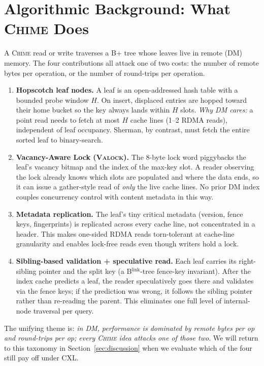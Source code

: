 \documentclass[11pt]{article}
\begin{document}
\section{Algorithmic Background: What \textsc{Chime} Does}
\label{sec:alg}
A \textsc{Chime} read or write traverses a B+ tree whose leaves live in remote (DM) memory. The four contributions all attack one of two costs: the number of remote bytes per operation, or the number of round-trips per operation.
\begin{enumerate}
    \item \textbf{Hopscotch leaf nodes.} A leaf is an open-addressed hash table with a bounded probe window $H$. On insert, displaced entries are hopped toward their home bucket so the key always lands within $H$ slots. \emph{Why DM cares:} a point read needs to fetch at most $H$ cache lines (1--2 RDMA reads), independent of leaf occupancy. Sherman, by contrast, must fetch the entire sorted leaf to binary-search.
    \item \textbf{Vacancy-Aware Lock (\textsc{Valock}).} The 8-byte lock word piggybacks the leaf's vacancy bitmap and the index of the max-key slot. A reader observing the lock already knows which slots are populated and where the data ends, so it can issue a gather-style read of \emph{only} the live cache lines. No prior DM index couples concurrency control with content metadata in this way.
    \item \textbf{Metadata replication.} The leaf's tiny critical metadata (version, fence keys, fingerprints) is replicated across every cache line, not concentrated in a header. This makes one-sided RDMA reads torn-tolerant at cache-line granularity and enables lock-free reads even though writers hold a lock.
    \item \textbf{Sibling-based validation + speculative read.} Each leaf carries its right-sibling pointer and the split key (a B$^{\text{link}}$-tree fence-key invariant). After the index cache predicts a leaf, the reader speculatively goes there and validates via the fence keys; if the prediction was wrong, it follows the sibling pointer rather than re-reading the parent. This eliminates one full level of internal-node traversal per query.
\end{enumerate}
The unifying theme is: \emph{in DM, performance is dominated by remote bytes per op and round-trips per op; every \textsc{Chime} idea attacks one of those two}. We will return to this taxonomy in Section~\ref{sec:discussion} when we evaluate which of the four still pay off under CXL.
\end{document}
